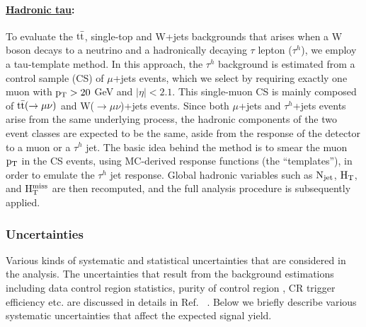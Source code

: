 \paragraph{\underline{Hadronic tau}: }

To evaluate the $\rm t\bar{t}$, single-top and W+jets backgrounds
that arises when a W boson decays to a neutrino and
a hadronically decaying $\tau$ lepton ($\tau^{h}$),
we employ a tau-template method. %
In this approach, the $\tau^{h}$ background is estimated from a control sample (CS)
of $\mu$+jets events,
which we select by requiring exactly one muon with $\rm p_{T}>20$ GeV and $|\eta|<2.1$. 
This single-muon CS is
mainly composed of $\rm t\bar{t}(\rightarrow \mu\nu)$ and W($\rightarrow \mu\nu$)+jets events.
Since both $\mu$+jets and $\tau^{h}$+jets events 
arise from the same underlying process,
the hadronic components of the two event classes are expected to be the same,
aside from the response of the 
detector to a muon or a $\tau^{h}$ jet. 
The basic idea behind the method
is to smear the muon $\rm p_{T}$ in the CS events,
using MC-derived response functions (the ``templates''),
in order to emulate the $\tau^{h}$ jet response.
Global hadronic variables such as $\rm N_{jet}$, $\rm H_{T}$, and $\rm H_{T}^{miss}$
are then recomputed, and the full analysis procedure is subsequently applied. 






\subsubsection{Uncertainties}

Various kinds of systematic and statistical uncertainties that are considered in the analysis. The uncertainties that result from the background estimations including data control region statistics, purity of control region , CR trigger efficiency etc. are discussed in details in Ref. ~\cite{CMS-PAS-SUS-15-002}. Below we briefly describe various systematic uncertainties that affect the expected signal yield.


